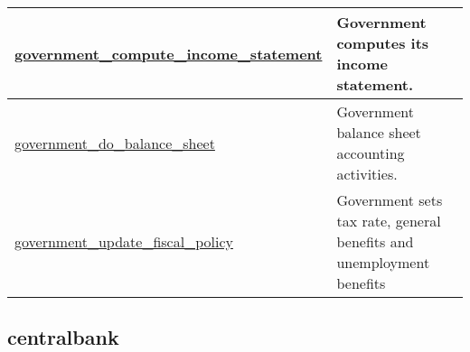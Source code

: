 \documentclass[a4paper,11pt]{article}
\begin{document}
\begin{landscape}
\begin{longtable}[H!]{ll}
\midrule
\url{government_compute_income_statement} \index{\url{government_compute_income_statement}} & \parbox{10cm}{Government computes its income statement.} \\
\midrule
\url{government_do_balance_sheet}  & \parbox{10cm}{Government balance sheet accounting activities.} \\
\midrule
\url{government_update_fiscal_policy}  & \parbox{10cm}{Government sets tax rate, general benefits and unemployment benefits} \\
\end{longtable}
\end{landscape}



\clearpage
\subsection{centralbank}
\end{document}
